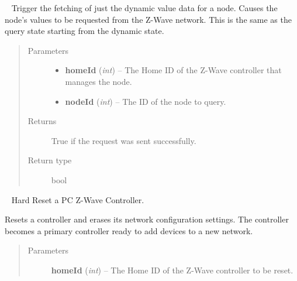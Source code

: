 \documentclass[letterpaper,10pt,english]{sphinxmanual}
\begin{document}
\begin{fulllineitems}

\begin{fulllineitems}
\label{libopenzwave:libopenzwave.PyManager.requestNodeState}~\label{libopenzwave:requestnodestate}
Trigger the fetching of just the dynamic value data for a node.
Causes the node's values to be requested from the Z-Wave network. This is the
same as the query state starting from the dynamic state.
\begin{quote}\begin{description}
\item[{Parameters}] \leavevmode\begin{itemize}
\item {} 
\textbf{homeId} (\emph{int}) -- The Home ID of the Z-Wave controller that manages the node.

\item {} 
\textbf{nodeId} (\emph{int}) -- The ID of the node to query.

\end{itemize}

\item[{Returns}] \leavevmode
True if the request was sent successfully.

\item[{Return type}] \leavevmode
bool

\end{description}\end{quote}

\end{fulllineitems}


\begin{fulllineitems}
\label{libopenzwave:libopenzwave.PyManager.resetController}~\label{libopenzwave:resetcontroller}
Hard Reset a PC Z-Wave Controller.

Resets a controller and erases its network configuration settings.  The
controller becomes a primary controller ready to add devices to a new network.
\begin{quote}\begin{description}
\item[{Parameters}] \leavevmode
\textbf{homeId} (\emph{int}) -- The Home ID of the Z-Wave controller to be reset.


\end{description}
\end{quote}
\end{fulllineitems}
\end{fulllineitems}
\end{document}

